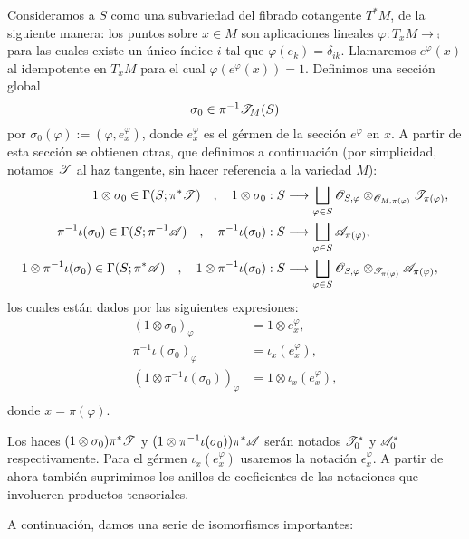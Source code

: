 {Consideramos a $S$ como una subvariedad del fibrado cotangente $T^*M$, de la siguiente manera: los puntos sobre $x\in M$ son aplicaciones lineales $\varphi:T_xM\to \comp$ para las cuales existe un \'unico \'indice $i$ tal que $\varphi (e_k)=\delta_{ik}$. Llamaremos $e^\varphi(x)$ al idempotente en $T_xM$ para el cual $\varphi (e^\varphi (x))=1$. Definimos una secci\'on global
$$\sigma_0\in \pi^{-1}\mathscr{T}_M(S)$$
por $\sigma_0(\varphi ):=(\varphi ,e^\varphi_x )$, donde $e^\varphi_x$ es el g\'ermen de la secci\'on $e^\varphi$ en $x$. A partir de esta secci\'on se obtienen otras, que definimos a continuaci\'on (por simplicidad, notamos $\mathscr{T}$ al haz tangente, sin hacer referencia a la variedad $M$):
$$
\begin{aligned}
1\otimes \sigma_0 \in \Gamma (S;\pi^*\mathscr{T}) \quad , \quad 1\otimes \sigma_0 &:S\longrightarrow \bigsqcup_{\varphi \in S}\mathscr{O}_{S,\varphi}\otimes_{\mathscr{O}_{M,\pi (\varphi )}}\mathscr{T}_{\pi (\varphi )}, \\
\pi^{-1}\iota (\sigma_0) \in \Gamma(S;\pi^{-1}\mathscr{A}) \quad , \quad \pi^{-1}\iota (\sigma_0) &: S\longrightarrow \bigsqcup_{\varphi \in S}\mathscr{A}_{\pi (\varphi )}, \\
1\otimes \pi^{-1}\iota (\sigma_0) \in \Gamma (S;\pi^*\mathscr{A}) \quad , \quad 1\otimes \pi^{-1}\iota (\sigma_0) &: S\longrightarrow \bigsqcup_{\varphi \in S}\mathscr{O}_{S,\varphi}\otimes_{\mathscr{T}_{\pi (\varphi )}}\mathscr{A}_{\pi (\varphi )}, \\
\end{aligned}
$$
los cuales est\'an dados por las siguientes expresiones:
$$
\begin{aligned}
(1\otimes \sigma_0)_\varphi &= 1\otimes e^{\varphi}_x ,\\
\pi^{-1}\iota (\sigma_0)_\varphi &= \iota_x(e^{\varphi}_x), \\
(1\otimes \pi^{-1}\iota (\sigma_0))_\varphi &= 1\otimes \iota_x(e^{\varphi}_x), \\
\end{aligned}
$$
donde $x=\pi (\varphi )$.

Los haces $(1\otimes \sigma_0)\pi^*\mathscr{T}$ y $(1\otimes \pi^{-1}\iota(\sigma_0))\pi^*\mathscr{A}$ ser\'an notados $\mathscr{T}_0^*$ y $\mathscr{A}_0^*$ respectivamente. Para el g\'ermen $\iota_x(e_x^\varphi )$ usaremos la notaci\'on $\epsilon^\varphi_x$. A partir de ahora tambi\'en suprimimos los anillos de coeficientes de las notaciones que involucren productos tensoriales.

A continuaci\'on, damos una serie de isomorfismos importantes:

}
